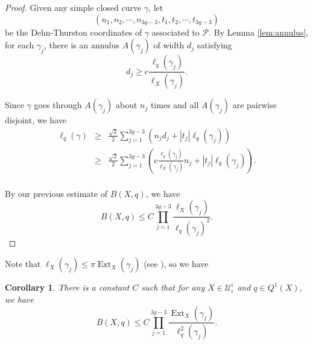 \documentclass{amsart}
\theoremstyle{plain}
\newtheorem{corollary}[theorem]{Corollary}
\theoremstyle{definition}
\numberwithin{equation}{section}
\begin{document}
\begin{proof}
    

    Given any simple closed curve $\gamma$, let 
    $$\left(n_1, n_2, \cdots, n_{3g-3},t_1, t_2, \cdots, t_{3g-3}\right)$$
    be the Dehn-Thurston coordinates of $\gamma$ associated to $\mathcal{P}$. By Lemma \ref{lem:annulus}, for each $\gamma_j$, there is an annulus $A(\gamma_j)$ of width $d_j$ satisfying 
    $$d_j \geq c \frac{\ell_q(\gamma_j)}{\ell_X(\gamma_j)}.$$

    
    Since $\gamma$ goes through $A(\gamma_j)$ about $n_j$ times and all $A(\gamma_j)$ are pairwise disjoint, we have
\begin{eqnarray*}
\ell_q(\gamma) &\geq &  \frac{\sqrt{2}}{2}\sum \limits_{j=1}^{3g-3} \left( n_jd_j+|t_j| \ell_q(\gamma_j) \right) \\
&\geq&   \frac{\sqrt{2}}{2} \sum \limits_{j=1}^{3g-3} \left( c \frac{\ell_q(\gamma_j)}{\ell_X(\gamma_j)}n_j +|t_j| \ell_q(\gamma_j) \right). \\
\end{eqnarray*}

    By our previous estimate of $B(X,q)$, we have
    $$B(X,q)\leq C \prod_{j=1}^{3g-3} \frac{\ell_X(\gamma_j)}{\ell_q(\gamma_j)^2}. $$   

\end{proof}


Note that  $\ell_X (\gamma_j) \leq \pi \operatorname{Ext}_X(\gamma_j)$ (see \cite{Maskit}), so we have
\begin{corollary} There is a constant $C$ such that for any $X\in \mathcal{U}_\epsilon^i$ and $q\in Q^1(X)$, we have 
    \begin{equation}\label{equ:extremalbound}
B(X,q)\leq C\prod_{j=1}^{3g-3}\frac{\operatorname{Ext}_X(\gamma_j)}
{\ell^2_q(\gamma_j)}.
\end{equation}
\end{corollary}
\end{document}
